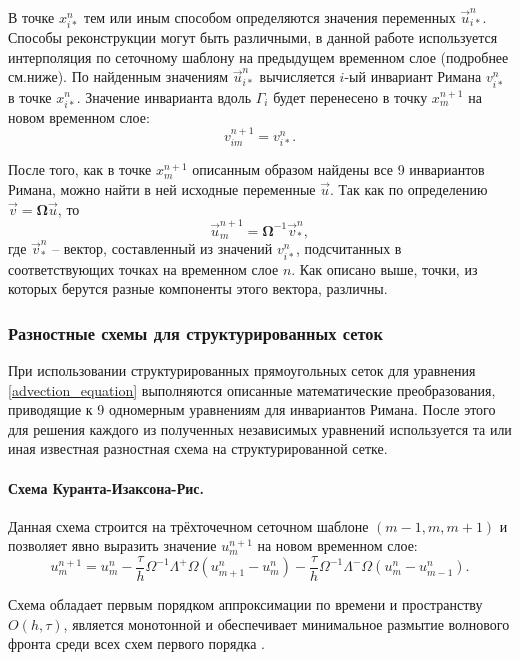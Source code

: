 В точке $x_{i*}^n$ тем или иным способом определяются значения переменных $\vec u_{i*}^n$. Способы реконструкции могут быть различными, в данной работе используется интерполяция по сеточному шаблону на предыдущем временном слое (подробнее см.ниже). По найденным значениям $\vec u_{i*}^n$ вычисляется $i$-ый инвариант Римана $v_{i*}^n$ в точке $x_{i*}^n$. Значение инварианта вдоль $\Gamma_i$ будет перенесено в точку $x_m^{n+1}$ на новом временном слое:
\begin{equation}
v_{im}^{n+1} = v_{i*}^n.
\end{equation}

После того, как в точке $x_m^{n+1}$ описанным образом найдены все 9 инвариантов Римана, можно найти в ней исходные переменные $\vec u$. Так как по определению ${\vec v}=\mathbf\Omega{\vec u}$, то
\begin{equation}
{\vec u}_m^{n+1}=\mathbf\Omega^{-1}{\vec v}_*^n,
\end{equation}
где ${\vec v}_*^n$ -- вектор, составленный из значений $v_{i*}^n$, подсчитанных в соответствующих точках на временном слое $n$. Как описано выше, точки, из которых берутся разные компоненты этого вектора, различны.


\subsubsection{Разностные схемы для структурированных сеток}

При использовании структурированных прямоугольных сеток для уравнения \eqref{advection_equation} выполняются описанные математические преобразования, приводящие к 9 одномерным уравнениям для инвариантов Римана. После этого для решения каждого из полученных независимых уравнений используется та или иная известная разностная схема на структурированной сетке.

\paragraph{Схема Куранта-Изаксона-Рис.} Данная схема строится на трёхточечном сеточном шаблоне $(m-1, m, m+1)$ и позволяет явно выразить значение $u_m^{n+1}$ на новом временном слое:
\begin{equation}
	\label{CIR scheme}
	u^{n+1}_m = u^n_m - \frac{\tau}{h} \Omega^{-1} \Lambda^+ \Omega (u^n_{m+1} - u^n_m) 
	- \frac{\tau}{h} \Omega^{-1} \Lambda^- \Omega (u^n_m - u^n_{m-1}) .
\end{equation}

Схема обладает первым порядком аппроксимации по времени и пространству $O(h, \tau)$, является монотонной и обеспечивает минимальное размытие волнового фронта среди всех схем первого порядка \cite{magomedov}.

